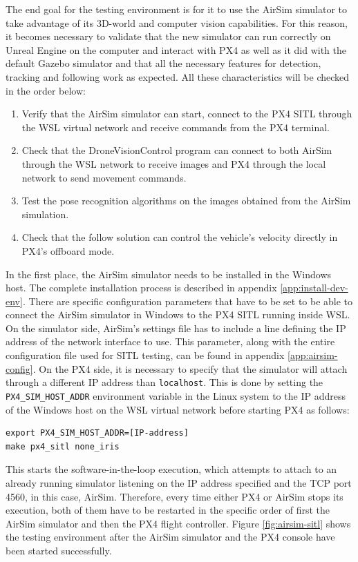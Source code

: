 The end goal for the testing environment is for it to use the AirSim simulator to take advantage of its 3D-world and computer vision capabilities.
For this reason, it becomes necessary to validate that the new simulator can run correctly on Unreal Engine on the computer and interact with PX4 as well as it did with the default Gazebo simulator and that all the necessary features for detection, tracking and following work as expected.
All these characteristics will be checked in the order below:
\begin{enumerate}
    \item Verify that the AirSim simulator can start, connect to the PX4 SITL through the WSL virtual network and receive commands from the PX4 terminal.
    \item Check that the DroneVisionControl program can connect to both AirSim through the WSL network to receive images and PX4 through the local network to send movement commands.
    \item Test the pose recognition algorithms on the images obtained from the AirSim simulation.
    \item Check that the follow solution can control the vehicle's velocity directly in PX4's offboard mode.
\end{enumerate}

In the first place, the AirSim simulator needs to be installed in the Windows host.
The complete installation process is described in appendix \ref{app:install-dev-env}.
There are specific configuration parameters that have to be set to be able to connect the AirSim simulator in Windows to the PX4 SITL running inside WSL.
On the simulator side, AirSim's settings file has to include a line defining the IP address of the network interface to use.
This parameter, along with the entire configuration file used for SITL testing, can be found in appendix \ref{app:airsim-config}.
On the PX4 side, it is necessary to specify that the simulator will attach through a different IP address than \texttt{localhost}.
This is done by setting the \texttt{PX4\_SIM\_HOST\_ADDR} environment variable in the Linux system to the IP address of the Windows host on the WSL virtual network before starting PX4 as follows:
\begin{verbatim}
export PX4_SIM_HOST_ADDR=[IP-address]
make px4_sitl none_iris
\end{verbatim}
This starts the software-in-the-loop execution, which attempts to attach to an already running simulator listening on the IP address specified and the TCP port 4560, in this case, AirSim.
Therefore, every time either PX4 or AirSim stops its execution, both of them have to be restarted in the specific order of first the AirSim simulator and then the PX4 flight controller.
Figure \ref{fig:airsim-sitl} shows the testing environment after the AirSim simulator and the PX4 console have been started successfully.

